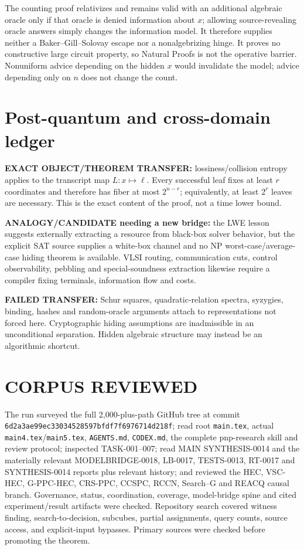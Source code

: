 \documentclass[11pt]{article}
\begin{document}
The counting proof relativizes and remains valid with an additional algebraic oracle only if that oracle is denied information about $x$; allowing source-revealing oracle answers simply changes the information model.  It therefore supplies neither a Baker--Gill--Solovay escape nor a nonalgebrizing hinge.  It proves no constructive large circuit property, so Natural Proofs is not the operative barrier.  Nonuniform advice depending on the hidden $x$ would invalidate the model; advice depending only on $n$ does not change the count.

\section{Post-quantum and cross-domain ledger}

\textbf{EXACT OBJECT/THEOREM TRANSFER:} lossiness/collision entropy applies to the transcript map $L:x\mapsto\ell$.  Every successful leaf fixes at least $r$ coordinates and therefore has fiber at most $2^{n-r}$; equivalently, at least $2^r$ leaves are necessary.  This is the exact content of the proof, not a time lower bound.

\textbf{ANALOGY/CANDIDATE needing a new bridge:} the LWE lesson suggests externally extracting a resource from black-box solver behavior, but the explicit SAT source supplies a white-box channel and no NP worst-case/average-case hiding theorem is available.  VLSI routing, communication cuts, control observability, pebbling and special-soundness extraction likewise require a compiler fixing terminals, information flow and costs.

\textbf{FAILED TRANSFER:} Schur squares, quadratic-relation spectra, syzygies, binding, hashes and random-oracle arguments attach to representations not forced here.  Cryptographic hiding assumptions are inadmissible in an unconditional separation.  Hidden algebraic structure may instead be an algorithmic shortcut.

\section{CORPUS REVIEWED}

The run surveyed the full 2,000-plus-path GitHub tree at commit
\texttt{6d2a3ae99ec33034528597bfdf7f6976714d218f}; read root
\texttt{main.tex}, actual \texttt{main4.tex}/\texttt{main5.tex},
\texttt{AGENTS.md}, \texttt{CODEX.md}, the complete pnp-research skill and
review protocol; inspected TASK-001--007; read MAIN SYNTHESIS-0014 and the
materially relevant MODELBRIDGE-0018, LB-0017, TESTS-0013, RT-0017 and
SYNTHESIS-0014 reports plus relevant history; and reviewed the HEC, VSC-HEC,
G-PPC-HEC, CRS-PPC, CCSPC, RCCN, Search--G and REACQ causal branch.  Governance,
status, coordination, coverage, model-bridge spine and cited experiment/result
artifacts were checked.  Repository search covered witness finding,
search-to-decision, subcubes, partial assignments, query counts, source access,
and explicit-input bypasses.  Primary sources \cite{krw,gk,bg} were checked
before promoting the theorem.
\end{document}
